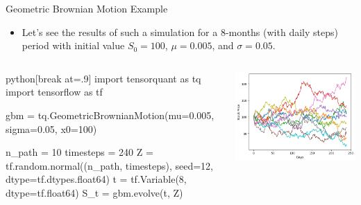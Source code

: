 \documentclass{beamer}
\begin{document}
\begin{frame}[fragile]{Geometric Brownian Motion Example}
\begin{itemize}
    \item Let's see the results of such a simulation for a 8-months (with daily steps) period with initial value $S_0=100$, $\mu=0.005$, and $\sigma=0.05$.
\end{itemize}

\begin{columns}
\begin{mintedbox}{python}[break at=.9\textheight]
import tensorquant as tq
import tensorflow as tf

gbm = tq.GeometricBrownianMotion(mu=0.005, sigma=0.05, x0=100)

n_path = 10
timesteps = 240
Z = tf.random.normal((n_path, timesteps), seed=12, dtype=tf.dtypes.float64)
t = tf.Variable(8, dtype=tf.float64)
S_t = gbm.evolve(t, Z)
\end{mintedbox}
    \includegraphics[width=1.1\linewidth]{images/gbm_realizations}
\end{columns}
\end{frame}
\end{document}
